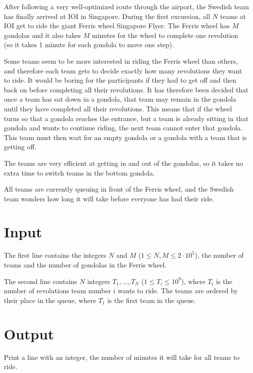 %
%
After following a very well-optimized route through the airport, the Swedish team has finally arrived at IOI in Singapore.
During the first excursion, all $N$ teams at IOI get to ride the giant Ferris wheel Singapore Flyer.
The Ferris wheel has $M$ gondolas and it also takes $M$ minutes for the wheel to complete one revolution
(so it takes 1 minute for each gondola to move one step).

Some teams seem to be more interested in riding the Ferris wheel than others, and therefore each team gets to decide exactly how many revolutions they want to ride.
It would be boring for the participants if they had to get off and then back on before completing all their revolutions.
It has therefore been decided that once a team has sat down in a gondola, that team may remain in the gondola until they have completed all their revolutions.
This means that if the wheel turns so that a gondola reaches the entrance, but a team is already sitting in that gondola and wants to continue riding,
the next team cannot enter that gondola. This team must then wait for an empty gondola or a gondola with a team that is getting off.

The teams are very efficient at getting in and out of the gondolas, so it takes no extra time to switch teams in the bottom gondola.

All teams are currently queuing in front of the Ferris wheel, and the Swedish team wonders how long it will take before everyone has had their ride.

\section*{Input}
The first line contains the integers $N$ and $M$ ($1 \leq N,M \leq 2 \cdot 10^5$),
the number of teams and the number of gondolas in the Ferris wheel.

The second line contains $N$ integers $T_1, \dots , T_N$ ($1 \leq T_i \leq 10^9$), where $T_i$ is the number of revolutions team
number $i$ wants to ride. The teams are ordered by their place in the queue, where $T_1$ is the first team in the queue.

\section*{Output}
Print a line with an integer, the number of minutes it will take for all teams to ride.

